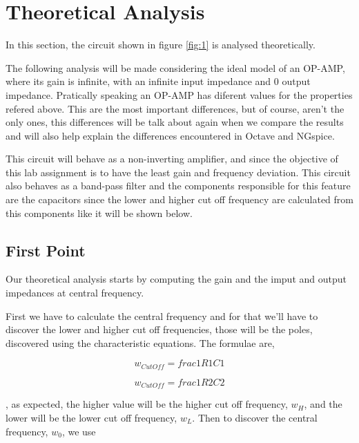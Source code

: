 \section{Theoretical Analysis}
\label{sec:theoretical}


\par In this section, the circuit shown in figure \ref{fig:1} is analysed theoretically.
\par The following analysis will be made considering the ideal model of an OP-AMP, where its gain is infinite, with an infinite input impedance and 0 output impedance. Pratically speaking an OP-AMP has diferent values for the properties refered above. This are the most important differences, but of course, aren't the only ones, this differences will be talk about again when we compare the results and will also help explain the differences encountered in Octave and NGspice.  
\par This circuit will behave as a non-inverting amplifier, and since the objective of this lab assignment is to have the least gain and frequency deviation. This circuit also behaves as a band-pass filter and the components responsible for this feature are the capacitors since the lower and higher cut off frequency are calculated from this components like it will be shown below.

\subsection{First Point}

\par Our theoretical analysis starts by computing the gain and the imput and output impedances at central frequency.
\par First we have to calculate the central frequency and for that we'll have to discover the lower and higher cut off frequencies, those will be the poles, discovered using the characteristic equations. The formulae are,

\begin{equation}
	w_{CutOff} = frac{1}{R1C1}
\end{equation}

\begin{equation}
	w_{CutOff} = frac{1}{R2C2}
\end{equation}

, as expected, the higher value will be the higher cut off frequency, $w_H$, and the lower will be the lower cut off frequency, $w_L$. Then to discover the central frequency, $w_0$, we use 

